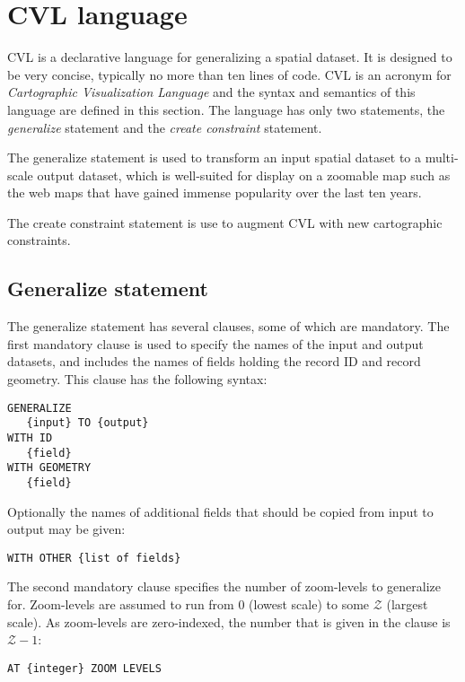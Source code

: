 \section{CVL language}
\label{sec:cvl-language}
CVL is a declarative language for generalizing a spatial dataset. It is designed to be very concise, typically no more than ten lines of code. CVL is an acronym for \emph{Cartographic Visualization Language} and the syntax and semantics of this language are defined in this section. The language has only two statements, the \emph{generalize} statement and the \emph{create constraint} statement. 

The generalize statement is used to transform an input spatial dataset to a multi-scale output dataset, which is well-suited for display on a zoomable map such as the web maps that have gained immense popularity over the last ten years. 

The create constraint statement is use to augment CVL with new cartographic constraints.

\subsection{Generalize statement}
The generalize statement has several clauses, some of which are mandatory. The first mandatory clause is used to specify the names of the input and output datasets, and includes the names of fields holding the record ID and record geometry. This clause has the following syntax:

\begin{lstlisting}
GENERALIZE 
   {input} TO {output}
WITH ID
   {field}
WITH GEOMETRY 
   {field}
\end{lstlisting}

Optionally the names of additional fields that should be copied from input to output may be given:

\begin{lstlisting}
WITH OTHER {list of fields}
\end{lstlisting}

The second mandatory clause specifies the number of zoom-levels to generalize for. Zoom-levels are assumed to run from 0 (lowest scale) to some $\mathcal{Z}$ (largest scale). As zoom-levels are zero-indexed, the number that is given in the clause is $\mathcal{Z}-1$:

\begin{lstlisting}
AT {integer} ZOOM LEVELS
\end{lstlisting}

